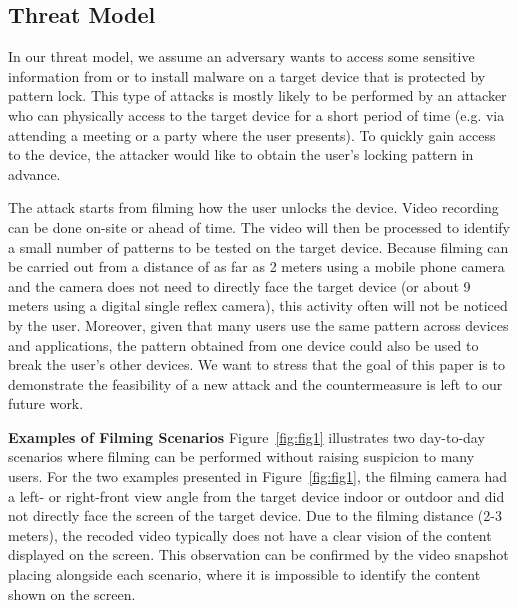     \subsection{Threat Model}
    \label{sec:scenarios}
        In our threat model, we assume an adversary wants to access some sensitive information from or to install malware on a
target device that is protected by pattern lock. This type of attacks is mostly likely to be performed by an attacker
who can physically access to the target device for a short period of time (e.g. via  attending a meeting or a party where
the user presents). To quickly gain access to the device, the attacker would like to obtain
the user's locking pattern in advance.

The attack starts from filming how the user unlocks the device. Video recording
can be done on-site or ahead of time. The video will then be processed to identify a small number of patterns to be
tested on the target device. Because filming can be carried out from a distance of as far as 2 meters using a
mobile phone camera and the camera does not need to directly face the target device (or about 9 meters using a digital single reflex camera), this activity often will not be
noticed by the user. Moreover, given that many users use the same pattern across devices and applications, the pattern
obtained from one device could also be used to break the user's other devices.  We want to stress that the goal of this paper is to
demonstrate the feasibility of a new attack and the countermeasure is left to our future work.

\noindent \textbf{Examples of Filming Scenarios} 
Figure~\ref{fig:fig1} illustrates two day-to-day scenarios where filming can be
performed without raising suspicion to many users. For the two examples presented in Figure~\ref{fig:fig1}, the
filming camera had a left- or right-front view angle from the target device indoor or outdoor and did not directly face the screen of the target device. Due to the filming distance (2-3 meters), the recoded video typically does not have a clear vision of
the content displayed on the screen.  This observation can be confirmed by the video snapshot placing
alongside each scenario, where it is impossible to identify the content shown on the screen.



